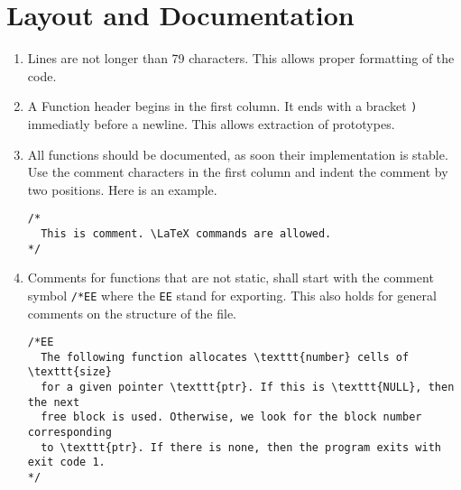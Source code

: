 \documentclass[12pt]{article}
\begin{document}
\section{Layout and Documentation}
\begin{enumerate}
\item
Lines are not longer than 79 characters. This allows proper formatting of
the code.
\item
A Function header begins in the first column. It ends with
a bracket \verb")" immediatly before a newline. This allows extraction
of prototypes.
\item
All functions should be documented, as soon their implementation is stable. 
Use the comment characters in the first column and indent the comment 
by two positions. Here is an example.

\begin{footnotesize}
\begin{verbatim}
/*
  This is comment. \LaTeX commands are allowed.
*/
\end{verbatim}
\end{footnotesize}
\item
Comments for functions that are not static, shall start with the comment 
symbol \verb"/*EE" where the \texttt{EE} stand for exporting. This also
holds for general comments on the structure of the file.
\begin{footnotesize}
\begin{verbatim}
/*EE
  The following function allocates \texttt{number} cells of \texttt{size}
  for a given pointer \texttt{ptr}. If this is \texttt{NULL}, then the next 
  free block is used. Otherwise, we look for the block number corresponding 
  to \texttt{ptr}. If there is none, then the program exits with exit code 1. 
*/


\end{verbatim}
\end{footnotesize}
\end{enumerate}
\end{document}
